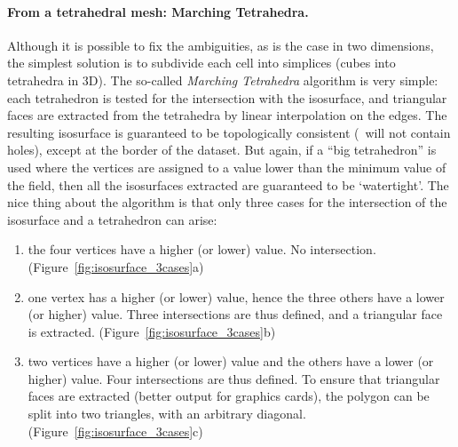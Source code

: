 \paragraph{From a tetrahedral mesh: Marching Tetrahedra.} 
Although it is possible to fix the ambiguities, as is the case in two dimensions, the simplest solution is to subdivide each cell into simplices (cubes into tetrahedra in 3D). 
The so-called \emph{Marching Tetrahedra} algorithm is very simple: each tetrahedron is tested for the intersection with the isosurface, and triangular faces are extracted from the tetrahedra by linear interpolation on the edges. 
The resulting isosurface is guaranteed to be topologically consistent (\ie\ will not contain holes), except at the border of the dataset. 
But again, if a ``big tetrahedron''%
is used where the vertices are assigned to a value lower than the minimum value of the field, then all the isosurfaces extracted are guaranteed to be `watertight'. 
The nice thing about the algorithm is that only three cases for the intersection of the isosurface and a tetrahedron can arise:
\begin{enumerate}
  \item the four vertices have a higher (or lower) value. No intersection. (Figure~\ref{fig:isosurface_3cases}a)
  \item one vertex has a higher (or lower) value, hence the three others have a lower (or higher) value. Three intersections are thus defined, and a triangular face is extracted. (Figure~\ref{fig:isosurface_3cases}b)
  \item two vertices have a higher (or lower) value and the others have a lower (or higher) value. Four intersections are thus defined. To ensure that triangular faces are extracted (better output for graphics cards), the polygon can be split into two triangles, with an arbitrary diagonal. (Figure~\ref{fig:isosurface_3cases}c)
  \end{enumerate}
